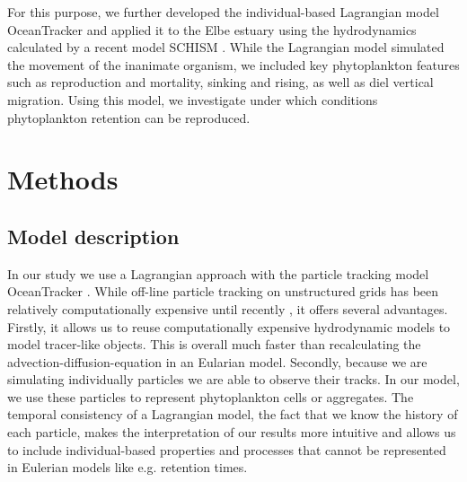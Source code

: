 \documentclass[npg, manuscript]{copernicus}
\begin{document}
For this purpose, we further developed the individual-based Lagrangian model OceanTracker \citep{Vennell2021} and applied it to the Elbe estuary using the hydrodynamics calculated by a recent model SCHISM \citep{Pein2021}.
While the Lagrangian model simulated the movement of the inanimate organism, we included key phytoplankton features such as reproduction and mortality, sinking and rising, as well as diel vertical migration.
Using this model, we investigate under which conditions phytoplankton retention can be reproduced.

\section{Methods}

\subsection{Model description}

In our study we use a Lagrangian approach with the particle tracking model OceanTracker \citep{Vennell2021}.
While off-line particle tracking on unstructured grids has been relatively computationally expensive until recently \citep{Vennell2021}, it offers several advantages.
Firstly, it allows us to reuse computationally expensive hydrodynamic models to model tracer-like objects.
This is overall much faster than recalculating the advection-diffusion-equation in an Eularian model.
Secondly, because we are simulating individually particles we are able to observe their tracks.
In our model, we use these particles to represent phytoplankton cells or aggregates.
The temporal consistency of a Lagrangian model, the fact that we know the history of each particle, makes the interpretation of our results more intuitive and allows us to include individual-based properties and processes that cannot be represented in Eulerian models like e.g. retention times.
\end{document}
